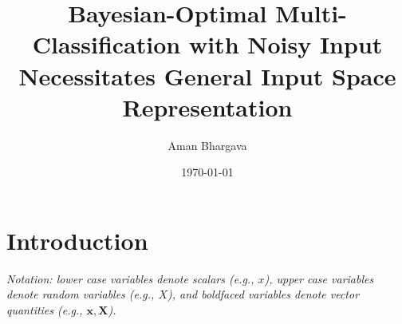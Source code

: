\documentclass[12pt]{article}
\begin{document}
\title{Bayesian-Optimal Multi-Classification with Noisy Input Necessitates
General Input Space Representation}

\author{Aman Bhargava}

\date{\today}
\maketitle

\section{Introduction}
\textit{Notation: lower case variables denote scalars (e.g., $x$), upper case variables denote random variables (e.g., $X$), and boldfaced variables denote vector quantities (e.g., $\mathbf x, \mathbf X$).} \\
\end{document}
